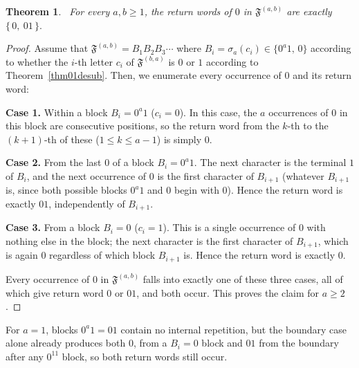 \documentclass[12pt]{amsart}
\theoremstyle{plain}
\newtheorem{theorem}{Theorem}[section]
\theoremstyle{definition}
\theoremstyle{remark}
\newcommand{\FD}{\mathfrak{F}}
\begin{document}
\begin{theorem}~\label{thm01return0}
For every $a,b\geqslant 1$, the return words of $0$ in $\FD^{(a,b)}$ are exactly $\{\,0,\ 01\,\}.$
\end{theorem}
\begin{proof}
Assume that $\FD^{(a,b)}=B_1B_2B_3\cdots$ where $B_i=\sigma_a(c_i)\in
\{0^a1,\,0\}$ according to whether the $i$-th letter $c_i$ of
$\FD^{(b,a)}$ is $0$ or $1$ according to Theorem~\ref{thm01desub}. Then, we enumerate every
occurrence of $0$ and its return word:

\medskip 

\noindent \textbf{Case 1.} Within a block $B_i=0^a1$ ($c_i=0$). In this case, the $a$ occurrences of $0$
in this block are consecutive positions, so the return word from the
$k$-th to the $(k{+}1)$-th of these ($1\le k\le a-1$) is simply $0$.

\medskip 

\noindent \textbf{Case 2.} From the last $0$ of a block $B_i=0^a1$. The next character is
the terminal $1$ of $B_i$, and the next occurrence of $0$ is the first
character of $B_{i+1}$ (whatever $B_{i+1}$ is, since both possible
blocks $0^a1$ and $0$ begin with $0$). Hence the return word is exactly
$01$, independently of $B_{i+1}$.

\medskip 


\noindent \textbf{Case 3.} From a block $B_i=0$ ($c_i=1$). This is a single occurrence of
$0$ with nothing else in the block; the next character is the first
character of $B_{i+1}$, which is again $0$ regardless of which block
$B_{i+1}$ is. Hence the return word is exactly $0$.

Every occurrence of $0$ in $\FD^{(a,b)}$ falls into exactly one of these
three cases, all of which give return word $0$ or $01$, and both occur. This proves the claim for
$a\geqslant2$.
\end{proof}
For $a=1$, blocks $0^a1=01$ contain no internal repetition,
but the boundary case alone already produces both $0$, from a $B_i=0$
block and $01$ from the boundary after any $0^11$ block, so both
return words still occur.
\end{document}
